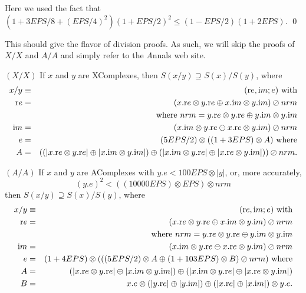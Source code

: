 Here we used the fact that 
\hfill $(1 + 3EPS/8 + (EPS/4)^2)(1+EPS/2)^2 \le (1 - EPS/2)(1+ 2EPS).$ \hfill\qed
{}
 
This should give the flavor of division proofs.  As such, we will skip the proofs of $X/X$ and $A/A$ and simply refer to the
 {\textit Annals} web site.
\begin{proposition}\label{GMT prop7.12}{$(X / X)$}
If $x$ and $y$ are {\textrm XComplexes,} then
$S(x / y) \supseteq S(x) / S(y)${\textrm ,} where
\begin{eqnarray*}
x  / y  &\equiv& ({\mathrm re},{\mathrm im};e)\hbox{ with}\\
{\mathrm re}& =& (x.{\mathrm re} \otimes y.{\mathrm re} \oplus x.{\mathrm im} \otimes y.{\mathrm im}) \oslash nrm\\
&&\hbox{ where $nrm = y.{\mathrm
re}
\otimes y.{\mathrm re} \oplus y.{\mathrm im} \otimes y.{\mathrm im}$}\\
{\mathrm im}& = &(x.{\mathrm im} \otimes y.{\mathrm re} \ominus x.{\mathrm re} \otimes y.{\mathrm im}) \oslash nrm\\
e& =& (5EPS/2) \otimes ((1
+  3EPS) \otimes A) \hbox{  where}\\
 A& =& 
((|x.{\mathrm re} \otimes y.{\mathrm re}| \oplus |x.{\mathrm im} \otimes y.{\mathrm im}|)
 \oplus 
 (|x.{\mathrm im} \otimes y.{\mathrm re}| \oplus |x.{\mathrm re} \otimes y.{\mathrm im}|))
\oslash nrm
.\end{eqnarray*}
\end{proposition}

\begin{proposition}\label{GMT prop7.13}{$(A / A)$}
If $x$ and $y$ are {\textrm AComplexes} with 
$y.e < 100 EPS \otimes |y|${\textrm ,} or{\textrm ,} more accurately{\textrm ,}
$$(y.e)^2< ((10000 EPS) \otimes EPS)\otimes nrm$$ then
$S(x / y) \supseteq S(x) / S(y)${\textrm ,} where
\begin{eqnarray*}
x  / y & \equiv& ({\mathrm re},{\mathrm im};e)\hbox{ with}\\
{\mathrm re}& =& (x.{\mathrm re} \otimes y.{\mathrm re} \oplus x.{\mathrm im} \otimes y.{\mathrm im}) \oslash nrm\\
&&\hbox{ where $nrm = y.{\mathrm
re}
\otimes y.{\mathrm re} \oplus y.{\mathrm im} \otimes y.{\mathrm im}$}\\
{\mathrm im}& =& (x.{\mathrm im} \otimes y.{\mathrm re} \ominus x.{\mathrm re} \otimes y.{\mathrm im}) \oslash nrm\\
e& =& (1 + 4EPS)\otimes 
(
((5 EPS/2) \otimes A \oplus (1+103EPS) \otimes B)
\oslash nrm)\hbox{ where}\\
 A& =& (|x.{\mathrm re} \otimes y.{\mathrm re}| \oplus |x.{\mathrm im}\otimes y.{\mathrm im}|) 
 \oplus
(|x.{\mathrm im} \otimes y.{\mathrm re}| \oplus | x.{\mathrm re} \otimes y.{\mathrm im}|)\\
B& =& x.e\otimes(|y.{\mathrm re}|\oplus|y.{\mathrm im}|)
\oplus
   (|x.{\mathrm re}|\oplus|x.{\mathrm im}|)\otimes y.e.
\end{eqnarray*}
\end{proposition}


